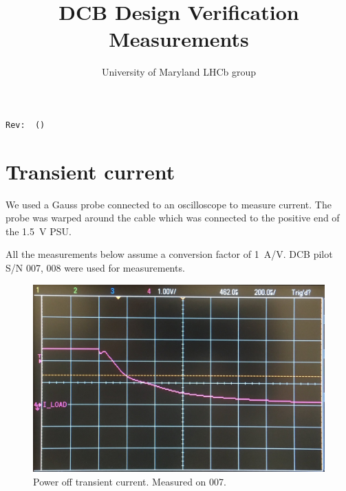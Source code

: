 \documentclass[11pt,letterpaper]{refart}
\title{DCB Design Verification Measurements}
\author{University of Maryland LHCb group}
\begin{document}
\maketitle
\hfill\small{\texttt{Rev:~\gitRel~(\gitAbbrevHash)}}
\tableofcontents


\section{Transient current}
We used a Gauss probe connected to an oscilloscope to measure current.
The probe was warped around the cable which was connected to the positive end of
the \SI{1.5}{\volt} PSU.

All the measurements below assume a conversion factor of \SI{1}{\ampere/\volt}.
DCB pilot S/N 007, 008 were used for measurements.

\begin{figure}[ht]
    \centering
    \includegraphics[width=0.8\linewidth]{./res/current_transient/power_off.jpg}
    \caption{Power off transient current. Measured on 007.}
\end{figure}
\end{document}
